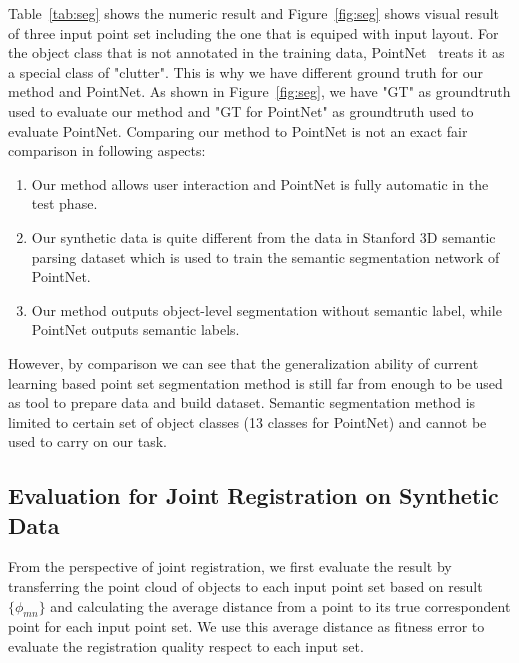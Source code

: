 %
Table~\ref{tab:seg} shows the numeric result and Figure~\ref{fig:seg} shows visual result of three input point set including the one that is equiped with input layout.
For the object class that is not annotated in the training data, PointNet~\cite{qi2016pointnet} treats it as a special class of "clutter". This is why we have different ground truth for our method and PointNet. As shown in Figure~\ref{fig:seg}, we have "GT" as groundtruth used to evaluate our method and "GT for PointNet" as groundtruth used to evaluate PointNet. 
%
Comparing our method to PointNet is not an exact fair comparison in following aspects:
\begin{enumerate}
\item Our method allows user interaction and PointNet is fully automatic in the test phase.
\item Our synthetic data is quite different from the data in Stanford 3D semantic parsing dataset\cite{semsegdataset} which is used to train the semantic segmentation network of PointNet.
\item Our method outputs object-level segmentation without semantic label, while PointNet outputs semantic labels.  
\end{enumerate}
However, by comparison we can see that the generalization ability of current learning based point set segmentation method is still far from enough to be used as tool to prepare data and build dataset. Semantic segmentation method is limited to certain set of object classes (13 classes for PointNet) and cannot be used to carry on our task. 
\subsection{Evaluation for Joint Registration on Synthetic Data}
From the perspective of joint registration, we first evaluate the result by transferring the point cloud of objects to each input point set based on result $\{\phi_{mn}\}$ and calculating the average distance from a point to its true correspondent point for each input point set.
We use this average distance as fitness error to evaluate the registration quality respect to each input set.

